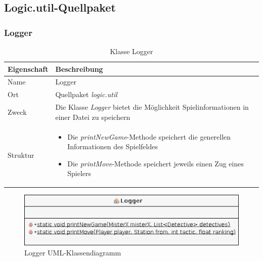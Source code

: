 \subsection{Logic.util-Quellpaket}
    \subsubsection{Logger}
        \begin{table}[H]
            \caption{Klasse Logger}
            \begin{tabular}{p{2.5cm}  p{9.5cm}} 
                \hline
                \textbf{Eigenschaft} & \textbf{Beschreibung}\\
                \hline
                Name & Logger\\
                Ort & Quellpaket \textit{logic.util}\\
                \hline
                Zweck &
                Die Klasse \textit{Logger} bietet die Möglichkeit Spielinformationen in einer Datei zu speichern 
                \\
                \hline
                Struktur &
                \begin{itemize}
                    \itemsep0em
                    \item Die \textit{printNewGame}-Methode speichert die generellen Informationen des Spielfeldes
                    \item Die \textit{printMove}-Methode speichert jeweils einen Zug eines Spielers
                \end{itemize}
                \\
                \hline
            \end{tabular}
        \end{table}
        \begin{figure}[H]
            \centering
            \includegraphics[scale=0.7]{img/uml/logger.png}   
            \caption{Logger UML-Klassendiagramm}
        \end{figure}


